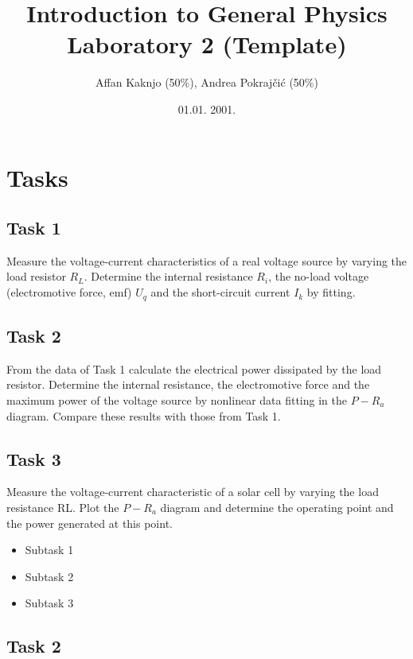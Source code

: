 \documentclass{article}
\providecommand{\tightlist}{%
	\setlength{\itemsep}{0pt}\setlength{\parskip}{0pt}%
}
\begin{document}
\title{Introduction to General Physics Laboratory 2 (Template)}
\author{Affan Kaknjo (50\%), Andrea Pokrajčić (50\%)}
\date{01.01. 2001.}
\maketitle

\section{Tasks}

\subsection{Task 1}

Measure the voltage-current characteristics of a real voltage source by
varying the load resistor \(R_L\). Determine the internal resistance
\(R_i\), the no-load voltage (electromotive force, emf) \(U_q\) and the
short-circuit current \(I_k\) by fitting.

\subsection{Task 2}

From the data of Task 1 calculate the electrical power dissipated by the
load resistor. Determine the internal resistance, the electromotive
force and the maximum power of the voltage source by nonlinear data
fitting in the \(P-R_a\) diagram. Compare these results with those from
Task 1.

\subsection{Task 3}

Measure the voltage-current characteristic of a solar cell by varying
the load resistance RL. Plot the \(P-R_a\) diagram and determine the
operating point and the power generated at this point.

\begin{itemize}
\tightlist
\item
  Subtask 1
\item
  Subtask 2
\item
  Subtask 3
\end{itemize}

\subsection{Task 2}
\end{document}
